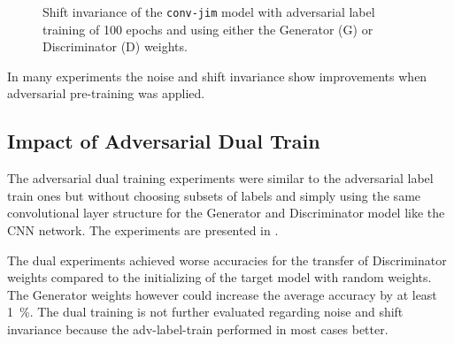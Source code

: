 \FloatBarrier
\noindent
\begin{figure}[!ht]
  \centering
  \quad
  \caption{Shift invariance of the \texttt{conv-jim} model with adversarial label training of 100 epochs and using either the Generator (G) or Discriminator (D) weights.}
  \label{fig:exp_adv_label_tb_shift_conv-jim}
\end{figure}
\FloatBarrier
\noindent
In many experiments the noise and shift invariance show improvements when adversarial pre-training was applied. 



\subsection{Impact of Adversarial Dual Train}
The adversarial dual training experiments were similar to the adversarial label train ones but without choosing subsets of labels and simply using the same convolutional layer structure for the Generator and Discriminator model like the CNN network.
The experiments are presented in .

The dual experiments achieved worse accuracies for the transfer of Discriminator weights compared to the initializing of the target model with random weights.
The Generator weights however could increase the average accuracy by at least \SI{1}{\percent}.
The dual training is not further evaluated regarding noise and shift invariance because the adv-label-train performed in most cases better.